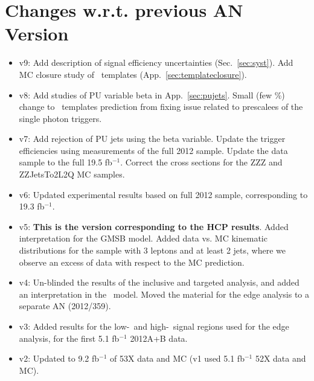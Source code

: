 \section{Changes w.r.t. previous AN Version}
\label{sec:changes}

\begin{itemize}

\item v9: Add description of signal efficiency uncertainties (Sec.~\ref{sec:syst}). 
Add MC closure study of \MET\ templates (App.~\ref{sec:templateclosure}).
\item v8: Add studies of PU variable beta in App.~\ref{sec:pujets}. Small (few \%) change to \MET\ templates prediction from fixing issue related to prescalees of the single photon triggers.
\item v7: Add rejection of PU jets using the beta variable. Update the trigger efficiencies using measurements of the full 2012 sample. Update the data sample to the full 19.5 fb$^{-1}$. Correct the cross sections for the ZZZ and ZZJetsTo2L2Q MC samples.
\item v6: Updated experimental results based on full 2012 sample, corresponding to 19.3 fb$^{-1}$.
\item v5: {\bf This is the version corresponding to the HCP results}. Added interpretation for the GMSB model. %
Added data vs. MC kinematic distributions for the sample with 3 leptons and at least 2 jets, where we observe an excess of data with respect to the MC prediction. %
\item v4: Un-blinded the results of the inclusive and targeted analysis, and added an interpretation in the \wzmet\ model. Moved the material for the edge analysis to a separate AN (2012/359).
\item v3: Added results for the low-\MET\ and high-\MET\ signal regions used for the edge analysis, for the first 5.1 fb$^{-1}$ 2012A+B data.
\item v2: Updated to 9.2 fb$^{-1}$ of 53X data and MC (v1 used 5.1 fb$^{-1}$ 52X data and MC).

\end{itemize}
